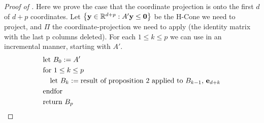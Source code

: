 \begin{proof}[Proof of ]
	Here we prove the case that the coordinate projection is onto the first $d$ of $d+p$ coordinates.  Let $\left\{\mathbf{y}\in\mathbb{R}^{d+p}:A'\mathbf{y} \leq \mathbf{0}\right\}$ be the H-Cone we need to project, and $\Pi$ the coordinate-projection we need to apply (the identity matrix with the last p columns deleted).  For each $1 \leq k \leq p$ we can use  in an incremental manner, starting with $A'$.
	\begin{align*}
		 & \text{let } B_0 := A'                                        \\
		 & \text{for } 1 \leq k \leq p                                  \\
		 & \quad \text{let } B_k :=
		\text{result of proposition 2 applied to $B_{k-1}$, $\mathbf{e}_{d+k}$} \\
		 & \text{endfor}                                                \\
		 & \text{return } B_p
	\end{align*}


\end{proof}
